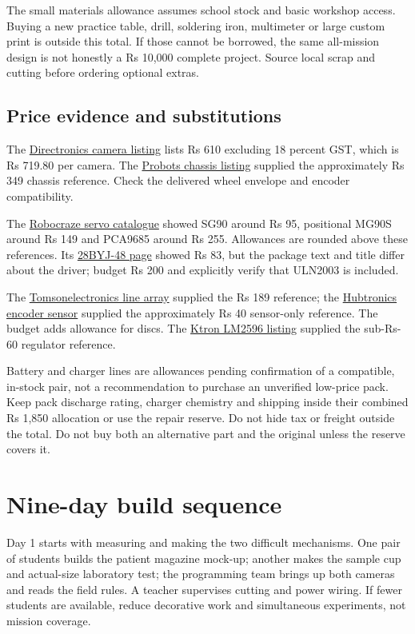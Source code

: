 \documentclass[10pt,a4paper]{article}
\begin{document}
The small materials allowance assumes school stock and basic workshop access. Buying a new practice table, drill, soldering iron, multimeter or large custom print is outside this total. If those cannot be borrowed, the same all-mission design is not honestly a Rs 10,000 complete project. Source local scrap and cutting before ordering optional extras.

\subsection{Price evidence and substitutions}
The \href{https://directronics.in/product/esp32-cam-wifi-module-camera-module}{Directronics camera listing} lists Rs 610 excluding 18 percent GST, which is Rs 719.80 per camera. The \href{https://probots.co.in/2wd-clear-acrylic-smart-robot-chassis-car-kit.html}{Probots chassis listing} supplied the approximately Rs 349 chassis reference. Check the delivered wheel envelope and encoder compatibility.

The \href{https://robocraze.com/collections/servo-motors-controllers}{Robocraze servo catalogue} showed SG90 around Rs 95, positional MG90S around Rs 149 and PCA9685 around Rs 255. Allowances are rounded above these references. Its \href{https://robocraze.com/products/5v-stepper-motor}{28BYJ-48 page} showed Rs 83, but the package text and title differ about the driver; budget Rs 200 and explicitly verify that ULN2003 is included.

The \href{https://www.tomsonelectronics.com/products/5-channel-line-tracking-sensor-module-bfd-1000}{Tomsonelectronics line array} supplied the Rs 189 reference; the \href{https://hubtronics.in/lm393-speed-measuring-sensor-module}{Hubtronics encoder sensor} supplied the approximately Rs 40 sensor-only reference. The budget adds allowance for discs. The \href{https://www.ktron.in/product/lm2596-step-down-module/}{Ktron LM2596 listing} supplied the sub-Rs-60 regulator reference.

Battery and charger lines are allowances pending confirmation of a compatible, in-stock pair, not a recommendation to purchase an unverified low-price pack. Keep pack discharge rating, charger chemistry and shipping inside their combined Rs 1,850 allocation or use the repair reserve. Do not hide tax or freight outside the total. Do not buy both an alternative part and the original unless the reserve covers it.

\clearpage
{}\section{Nine-day build sequence}
Day 1 starts with measuring and making the two difficult mechanisms. One pair of students builds the patient magazine mock-up; another makes the sample cup and actual-size laboratory test; the programming team brings up both cameras and reads the field rules. A teacher supervises cutting and power wiring. If fewer students are available, reduce decorative work and simultaneous experiments, not mission coverage.
\end{document}
